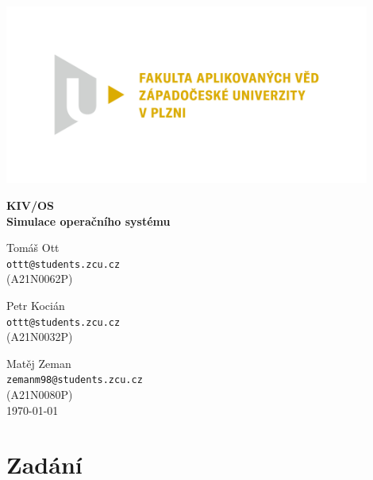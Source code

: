 \documentclass[ 12pt, a4paper]{article}
\begin{document}
\def\code#1{\texttt{#1}}

%
\centerline{\includegraphics[width=12cm]{logo.png}}
\vspace*{50px}
\begin{center}
	{\LARGE\bf\noindent KIV/OS \\ Simulace operačního systému}\\
	\vspace*{40px}  
	
	Tomáš Ott\\
	\texttt{ottt@students.zcu.cz}\\ 
	(A21N0062P)\\
	\vspace*{10px}  
	
	Petr Kocián\\
	\texttt{ottt@students.zcu.cz}\\ 
	(A21N0032P)\\
	\vspace*{10px}  
	
	Matěj Zeman\\
	\texttt{zemanm98@students.zcu.cz}\\ 
	(A21N0080P)\\
	
	\vspace*{\fill}  
	\hspace*{\fill} \today \\
\end{center}
\newpage
\tableofcontents
\newpage



\section{Zadání}
\end{document}

